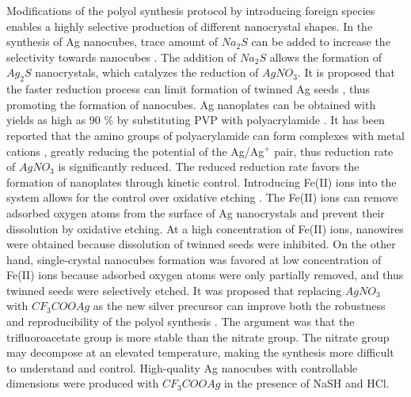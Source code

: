 Modifications of the polyol synthesis protocol by introducing foreign species enables a highly selective production of different nanocrystal shapes.
In the synthesis of Ag nanocubes, trace amount of $Na_2S$ can be added to increase the selectivity towards nanocubes \cite{Skrabalak_2007,Siekkinen_2006}.
The addition of $Na_2S$ allows the formation of $Ag_2S$ nanocrystals, which catalyzes the reduction of $AgNO_3$.
It is proposed that the faster reduction process can limit formation of twinned Ag seeds \cite{Wiley_2006}, thus promoting the formation of nanocubes.
Ag nanoplates can be obtained with yields as high as 90 \% by substituting PVP with polyacrylamide \cite{Xiong_2007}.
It has been reported that the amino groups of polyacrylamide can form complexes with metal cations \cite{Sari_2006}, greatly reducing the potential of the Ag/Ag$^+$ pair, thus reduction rate of $AgNO_3$ is significantly reduced.
The reduced reduction rate favors the formation of nanoplates through kinetic control.
Introducing Fe(II) ions into the system allows for the control over oxidative etching \cite{Wiley_2005}.
The Fe(II) ions can remove adsorbed oxygen atoms from the surface of Ag nanocrystals and prevent their dissolution by oxidative etching.
At a high concentration of Fe(II) ions, nanowires were obtained because dissolution of twinned seeds were inhibited.
On the other hand, single-crystal nanocubes formation was favored at low concentration of Fe(II) ions because adsorbed oxygen atoms were only partially removed, and thus twinned seeds were selectively etched.
It was proposed that replacing $AgNO_3$ with $CF_3COOAg$ as the new silver precursor can improve both the robustness and reproducibility of the polyol synthesis \cite{Zhang_2010}.
The argument was that the trifluoroacetate group is more stable than the nitrate group.
The nitrate group may decompose at an elevated temperature, making the synthesis more difficult to understand and control.
High-quality Ag nanocubes with controllable dimensions were produced with $CF_3COOAg$ in the presence of NaSH and HCl.

